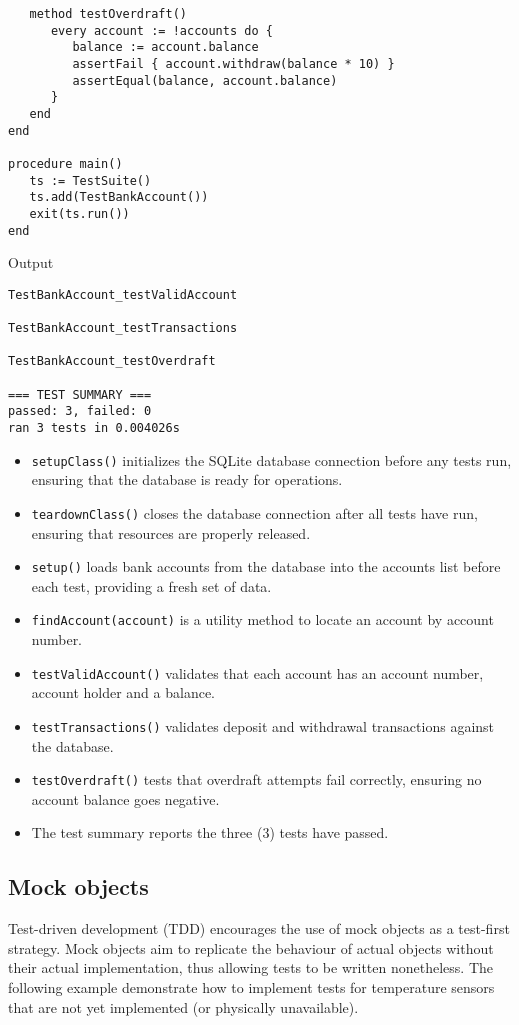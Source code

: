 \documentclass[letterpaper,12pt]{article}
\begin{document}
\begin{verbatim}
   method testOverdraft()
      every account := !accounts do {
         balance := account.balance
         assertFail { account.withdraw(balance * 10) }
         assertEqual(balance, account.balance)
      }
   end
end

procedure main()
   ts := TestSuite()
   ts.add(TestBankAccount())
   exit(ts.run())
end
\end{verbatim}

\noindent Output
\begin{verbatim}
TestBankAccount_testValidAccount

TestBankAccount_testTransactions

TestBankAccount_testOverdraft

=== TEST SUMMARY ===
passed: 3, failed: 0
ran 3 tests in 0.004026s
\end{verbatim}

\newpage{}
\begin{itemize}
   \item \texttt{setupClass()} initializes the SQLite database connection before any tests run, ensuring that the database is ready for operations.
   \item \texttt{teardownClass()} closes the database connection after all tests have run, ensuring that resources are properly released.
   \item \texttt{setup()} loads bank accounts from the database into the accounts list before each test, providing a fresh set of data.
   \item \texttt{findAccount(account)} is a utility method to locate an account by account number.
   \item \texttt{testValidAccount()} validates that each account has an account number, account holder and a balance.
   \item \texttt{testTransactions()} validates deposit and withdrawal transactions against the database.
   \item \texttt{testOverdraft()} tests that overdraft attempts fail correctly, ensuring no account balance goes negative.
   \item The test summary reports the three (3) tests have passed.
\end{itemize}

\newpage\subsection{Mock objects}

Test-driven development (TDD) encourages the use of mock objects as a test-first strategy. Mock objects aim to replicate the behaviour of actual objects without their actual implementation, thus allowing tests to be written nonetheless. The following example demonstrate how to implement tests for temperature sensors that are not yet implemented (or physically unavailable).
\end{document}
